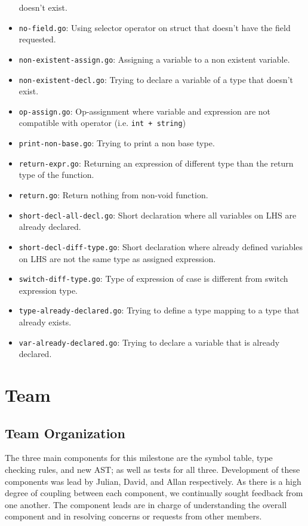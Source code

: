 \documentclass[11pt]{article}
\begin{document}
\begin{itemize}
doesn't exist.
\item \texttt{no-field.go}: Using selector operator on struct that doesn't have
the field requested.
\item \texttt{non-existent-assign.go}: Assigning a variable to a non existent
variable.
\item \texttt{non-existent-decl.go}: Trying to declare a variable of a type that
doesn't exist.
\item \texttt{op-assign.go}: Op-assignment where variable and expression are not
compatible with operator (i.e. \texttt{int + string})
\item \texttt{print-non-base.go}: Trying to print a non base type.
\item \texttt{return-expr.go}: Returning an expression of different type than the
return type of the function.
\item \texttt{return.go}: Return nothing from non-void function.
\item \texttt{short-decl-all-decl.go}: Short declaration where all variables on
LHS are already declared.
\item \texttt{short-decl-diff-type.go}: Short declaration where already defined
variables on LHS are not the same type as assigned expression.
\item \texttt{switch-diff-type.go}: Type of expression of case is different from
switch expression type.
\item \texttt{type-already-declared.go}: Trying to define a type mapping to a
type that already exists.
\item \texttt{var-already-declared.go}: Trying to declare a variable that is
already declared.
\end{itemize}
\section{Team}
\label{sec:org3907902}
\subsection{Team Organization}
\label{sec:org13e081e}
The three main components for this milestone are the symbol table,
type checking rules, and new AST; as well as tests for all
three. Development of these components was lead by Julian, David,
and Allan respectively. As there is a high degree of coupling
between each component, we continually sought feedback from one
another. The component leads are in charge of understanding the
overall component and in resolving concerns or requests from other
members.
\end{document}
